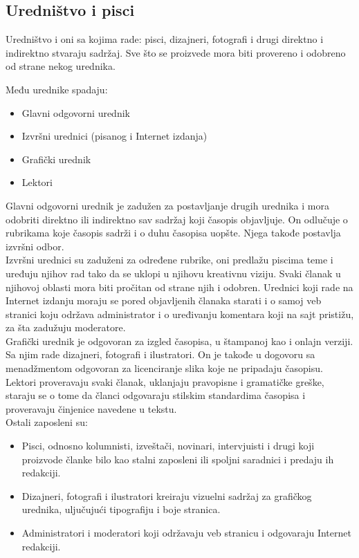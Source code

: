 \subsection*{Uredništvo i pisci}

Uredništvo i oni sa kojima rade: pisci, dizajneri, fotografi i drugi direktno i indirektno stvaraju sadržaj. Sve što se proizvede mora biti provereno i odobreno od strane nekog urednika. 

Među urednike spadaju:
\begin{itemize}
\item Glavni odgovorni urednik
\item Izvršni urednici (pisanog i Internet izdanja)
\item Grafički urednik
\item Lektori
\end{itemize}

Glavni odgovorni urednik je zadužen za postavljanje drugih urednika i mora odobriti direktno ili indirektno sav sadržaj koji časopis objavljuje. On odlučuje o rubrikama koje časopis sadrži i o duhu časopisa uopšte. Njega takođe postavlja izvršni odbor. \\

Izvršni urednici su zaduženi za određene rubrike, oni predlažu piscima teme i uređuju njihov  rad tako da se uklopi u njihovu kreativnu viziju. Svaki članak u  njihovoj oblasti mora biti pročitan od strane njih i odobren. Urednici koji rade na Internet izdanju moraju se pored objavljenih članaka starati i o samoj veb stranici koju održava administrator i o uređivanju komentara koji na sajt pristižu, za šta zadužuju moderatore. \\

Grafički urednik je odgovoran za izgled časopisa, u štampanoj kao i onlajn verziji. Sa njim rade dizajneri, fotografi i ilustratori. On je takođe u dogovoru sa menadžmentom odgovoran za licenciranje slika koje ne pripadaju časopisu. \\

Lektori proveravaju svaki članak, uklanjaju pravopisne i gramatičke greške, staraju se o tome da članci odgovaraju stilskim standardima časopisa i proveravaju činjenice navedene u tekstu. \\

Ostali zaposleni su:
\begin{itemize}
\item  Pisci, odnosno kolumnisti, izveštači, novinari, intervjuisti i drugi koji proizvode članke bilo kao stalni zaposleni ili spoljni saradnici i predaju ih redakciji.
\item  Dizajneri, fotografi i ilustratori kreiraju vizuelni sadržaj za grafičkog urednika, uljučujući tipografiju i boje stranica.
\item  Administratori i moderatori koji održavaju veb stranicu i odgovaraju Internet redakciji.
\end{itemize}

